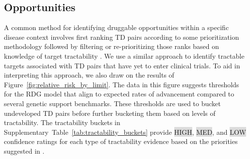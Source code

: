 \documentclass{article}
\begin{document}
\subsection{Opportunities}
\label{sec:results_opportunities}

A common method for identifying druggable opportunities within a specific disease context involves first ranking TD pairs according to some prioritization methodology followed by filtering or re-prioritizing those ranks based on knowledge of target tractability \cite{PMID:28356508,PMID:35401535,PMID:31253980}. We use a similar approach to identify tractable targets associated with TD pairs that have yet to enter clinical trials. To aid in interpreting this approach, we also draw on the results of Figure~\ref{fig:relative_risk_by_limit}. The data in this figure suggests thresholds for the RDG model that align to expected rates of advancement compared to several genetic support benchmarks. These thresholds are used to bucket undeveloped TD pairs before further bucketing them based on levels of tractability. The tractability buckets in Supplementary~Table~\ref{tab:tractability_buckets} provide \colorbox{Gainsboro}{HIGH}, \colorbox{Gainsboro}{MED}, and \colorbox{Gainsboro}{LOW} confidence ratings for each type of tractability evidence based on the priorities suggested in \cite{OTTractability}.
\end{document}
